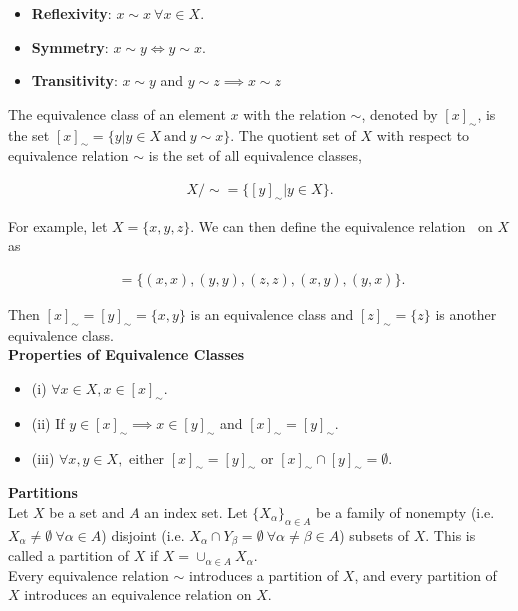 \documentclass{article}
\numberwithin{theorem}{subsection}
\numberwithin{theorem}{subsubsection}
\theoremstyle{definition}
\numberwithin{definition}{subsection}
\numberwithin{definition}{subsubsection}
\begin{document}
\begin{itemize}
    \item \textbf{Reflexivity}: $x \sim x\ \forall x \in X$.
    \item \textbf{Symmetry}: $x \sim y \Leftrightarrow y \sim x$.
    \item \textbf{Transitivity}: $x \sim y$ and $y \sim z \implies x \sim z$
\end{itemize}

\noindent The equivalence class of an element $x$ with the relation $\sim$, denoted by $[x]_{\sim}$, is the set $[x]_{\sim} = \{y|y \in X\ \text{and}\ y \sim x\}$. The quotient set of $X$ with respect to equivalence relation $\sim$ is the set of all equivalence classes,

\begin{gather*}
    X/ \sim = \{[y]_{\sim}|y \in X\}.
\end{gather*}

\noindent For example, let $X = \{x,y,z\}$. We can then define the equivalence relation $~$ on $X$ as

\begin{gather*}
    ~= \{(x,x),(y,y),(z,z),(x,y),(y,x)\}.
\end{gather*}

\noindent Then $[x]_{\sim} = [y]_{\sim} = \{x,y\}$ is an equivalence class and $[z]_{\sim} = \{z\}$ is another equivalence class.
\\

\noindent \textbf{Properties of Equivalence Classes}
\begin{itemize}
    \item (i) $\forall x \in X, x \in [x]_{\sim}$.
    \item (ii) If $y \in [x]_{\sim} \implies x \in [y]_{\sim}$ and $[x]_{\sim} = [y]_{\sim}$.
    \item (iii) $\forall x, y \in X,$ either $[x]_{\sim} = [y]_{\sim}$ or $[x]_{\sim} \cap [y]_{\sim} = \emptyset$.\\
\end{itemize}

\noindent \textbf{Partitions}\\
\indent Let $X$ be a set and $A$ an index set. Let $\{X_{\alpha}\}_{\alpha \in A}$ be a family of nonempty (i.e. $X_{\alpha} \neq \emptyset\ \forall \alpha \in A$) disjoint (i.e. $X_{\alpha} \cap Y_{\beta} = \emptyset\ \forall \alpha \neq \beta \in A$) subsets of $X$. This is called a partition of $X$ if $X = \cup_{\alpha \in A}X_{\alpha}$.\\
\indent Every equivalence relation $\sim$ introduces a partition of $X$, and every partition of $X$ introduces an equivalence relation on $X$.
\end{document}
